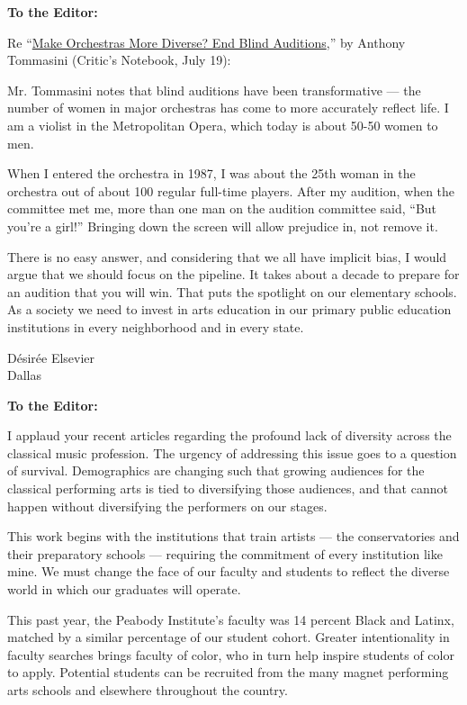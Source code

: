 \textbf{To the Editor:}

Re
``\href{https://www.nytimes.com/2020/07/16/arts/music/blind-auditions-orchestras-race.html}{Make
Orchestras More Diverse? End Blind Auditions},'' by Anthony Tommasini
(Critic's Notebook, July 19):

Mr. Tommasini notes that blind auditions have been transformative ---
the number of women in major orchestras has come to more accurately
reflect life. I am a violist in the Metropolitan Opera, which today is
about 50-50 women to men.

When I entered the orchestra in 1987, I was about the 25th woman in the
orchestra out of about 100 regular full-time players. After my audition,
when the committee met me, more than one man on the audition committee
said, ``But you're a girl!'' Bringing down the screen will allow
prejudice in, not remove it.

There is no easy answer, and considering that we all have implicit bias,
I would argue that we should focus on the pipeline. It takes about a
decade to prepare for an audition that you will win. That puts the
spotlight on our elementary schools. As a society we need to invest in
arts education in our primary public education institutions in every
neighborhood and in every state.

Désirée Elsevier\\
Dallas

\textbf{To the Editor:}

I applaud your recent articles regarding the profound lack of diversity
across the classical music profession. The urgency of addressing this
issue goes to a question of survival. Demographics are changing such
that growing audiences for the classical performing arts is tied to
diversifying those audiences, and that cannot happen without
diversifying the performers on our stages.

This work begins with the institutions that train artists --- the
conservatories and their preparatory schools --- requiring the
commitment of every institution like mine. We must change the face of
our faculty and students to reflect the diverse world in which our
graduates will operate.

This past year, the Peabody Institute's faculty was 14 percent Black and
Latinx, matched by a similar percentage of our student cohort. Greater
intentionality in faculty searches brings faculty of color, who in turn
help inspire students of color to apply. Potential students can be
recruited from the many magnet performing arts schools and elsewhere
throughout the country.

